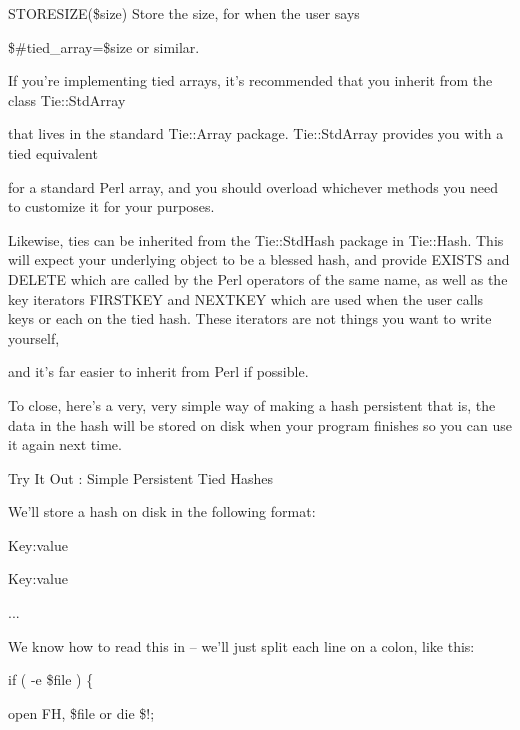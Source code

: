 \documentclass[a4paper,11pt]{book}
\begin{document}
\noindent STORESIZE(\$size) Store the size, for when the user says

\noindent \$\#tied\_array=\$size or similar.

\noindent 

\noindent 

\noindent If you're implementing tied arrays, it's recommended that you inherit from the class Tie::StdArray

\noindent that lives in the standard Tie::Array package. Tie::StdArray provides you with a tied equivalent

\noindent for a standard Perl array, and you should overload whichever methods you need to customize it for your purposes.

\noindent 

\noindent Likewise, ties can be inherited from the Tie::StdHash package in Tie::Hash. This will expect your underlying object to be a blessed hash, and provide EXISTS and DELETE which are called by the Perl operators of the same name, as well as the key iterators FIRSTKEY and NEXTKEY which are used when the user calls keys or each on the tied hash. These iterators are not things you want to write yourself,

\noindent and it's far easier to inherit from Perl if possible.

\noindent 

\noindent To close, here's a very, very simple way of making a hash persistent that is, the data in the hash will be stored on disk when your program finishes so you can use it again next time.

\noindent 

\noindent 

\noindent Try It Out : Simple Persistent Tied Hashes

\noindent We'll store a hash on disk in the following format:

\noindent 

\noindent 

\noindent Key:value

\noindent Key:value

\noindent ...

\noindent 

\noindent We know how to read this in -- we'll just split each line on a colon, like this:

\noindent 

\noindent 

\noindent if ( -e \$file ) \{

\noindent open FH, \$file or die \$!;
\end{document}
